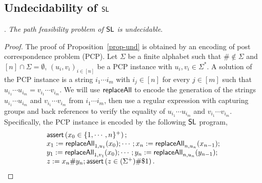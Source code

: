 \subsection{Undecidability of $\mathsf{SL}$}

.
{\it The path feasibility problem of $\mathsf{SL}$ is undecidable}.

\begin{proof}
The proof of Proposition~\ref{prop-und} is obtained by an encoding of post correspondence problem (PCP).
Let $\Sigma$ be a finite alphabet such that $\# \not\in \Sigma$ and $[n] \cap \Sigma = \emptyset$, $(u_i, v_i)_{i \in [n]}$ be a PCP instance with $u_i, v_i \in \Sigma^\ast$. A solution of the PCP instance is a string $i_1 \cdots i_m$ with $i_j \in [n]$ for every $j \in [m]$ such that $u_{i_1} \cdots u_{i_m} = v_{i_1} \cdots v_{i_m}$. We will use $\mathsf{replaceAll}$ to encode the generation of the strings $u_{i_1} \cdots u_{i_m}$ and $v_{i_1} \cdots v_{i_m}$ from $i_1 \cdots i_m$, then use a regular expression with  capturing groups and back references to verify the equality of $u_{i_1} \cdots u_{i_m}$ and $v_{i_1} \cdots v_{i_m}$. Specifically, the PCP instance is encoded by the following $\mathsf{SL}$ program,
\[
\begin{array}{l}
\textsf{assert}\left(x_0 \in \{1, \cdots, n\}^+\right); \\
x_1 := \mathsf{replaceAll}_{1, u_1}(x_0); \cdots; x_n:=\mathsf{replaceAll}_{n, u_n}(x_{n-1}); \\
y_1:=\mathsf{replaceAll}_{1, v_1}(x_0); \cdots; y_n:=\mathsf{replaceAll}_{n, u_n}(y_{n-1});\\
z:= x_n \# y_n; \textsf{assert}\left(z \in (\Sigma^+)\#\$1\right).
\end{array}
\]
\end{proof}


